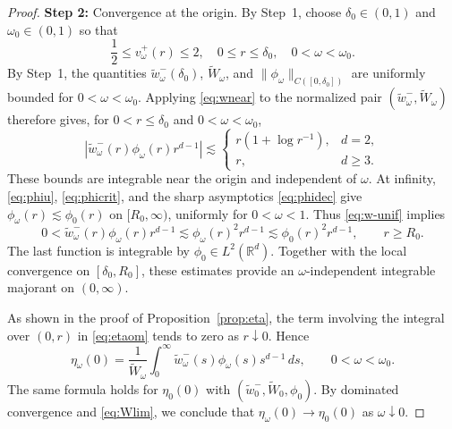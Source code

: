 \documentclass[12pt, a4paper, reqno]{amsart}
\numberwithin{equation}{section}
\theoremstyle{definition}
\theoremstyle{remark}
\newcommand{\R}{\mathbb R}
\begin{document}
\begin{proof}
\medskip
\noindent\textbf{Step 2:} Convergence at the origin.
By Step~1, choose $\delta_0\in(0,1)$ and
$\omega_0\in(0,1)$ so that
\[
  \frac12\le v_\omega^+(r)\le2,
  \quad 0\le r\le \delta_0,\quad 0<\omega<\omega_0.
\]
By Step~1, the quantities $\widetilde w_\omega^-(\delta_0)$,
$\widetilde W_\omega$, and $\|\phi_\omega\|_{C([0,\delta_0])}$
are uniformly bounded for $0<\omega<\omega_0$.
Applying \eqref{eq:wnear} to the normalized
pair $(\widetilde w_\omega^-,\widetilde W_\omega)$ therefore gives,
for $0<r\le\delta_0$ and $0<\omega<\omega_0$,
\[
  |\widetilde w_\omega^-(r)\phi_\omega(r)r^{d-1}|
  \lesssim
  \begin{cases}
    r(1+\log r^{-1}), & d=2,\\
    r, & d\ge3.
  \end{cases}
\]
These bounds are integrable near the origin and independent of $\omega$.
At infinity, \eqref{eq:phiu}, \eqref{eq:phicrit}, and the sharp
asymptotics \eqref{eq:phidec} give
$\phi_\omega(r)\lesssim\phi_0(r)$ on $[R_0,\infty)$, uniformly
for $0<\omega<1$. Thus \eqref{eq:w-unif} implies
\[
  0<\widetilde w_\omega^-(r)\phi_\omega(r)r^{d-1}
  \lesssim\phi_\omega(r)^2r^{d-1}
  \lesssim\phi_0(r)^2r^{d-1},\qquad r\ge R_0.
\]
The last function is integrable by $\phi_0\in L^2(\R^d)$.
Together with the local convergence on $[\delta_0,R_0]$, these estimates provide an \(\omega\)-independent integrable majorant on \((0,\infty)\).

As shown in the proof of Proposition~\ref{prop:eta},
the term involving the integral over $(0,r)$ in \eqref{eq:etaom} tends to zero as $r\downarrow0$. Hence
\begin{equation*}
  \eta_\omega(0)
  =\frac1{\widetilde W_\omega}
   \int_0^\infty\widetilde w_\omega^-(s)\phi_\omega(s)s^{d-1}\,ds,
  \qquad 0<\omega<\omega_0.
\end{equation*}
The same formula holds for $\eta_0(0)$ with
$(\widetilde w_0^-,\widetilde W_0,\phi_0)$.
By dominated convergence and \eqref{eq:Wlim}, we conclude that
$\eta_\omega(0)\to\eta_0(0)$ as $\omega\downarrow0$.


\end{proof}
\end{document}
